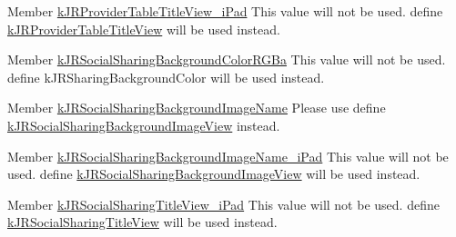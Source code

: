 \label{deprecated__deprecated000012}
\hypertarget{deprecated__deprecated000012}{}
 
\begin{DoxyDescription}
\item[Member \hyperlink{group__custom_interface_ga52c322e9fd2aa78cbd64d050f0fd5e41}{kJRProviderTableTitleView\_\-iPad} ]This value will not be used. define \hyperlink{group__custom_interface_ga0bce97edf43c9cdf53cbcd1aa92c4798}{kJRProviderTableTitleView} will be used instead. 
\end{DoxyDescription}

\label{deprecated__deprecated000005}
\hypertarget{deprecated__deprecated000005}{}
 
\begin{DoxyDescription}
\item[Member \hyperlink{group__custom_interface_ga6554a101f0e2e9474a77262143dc528b}{kJRSocialSharingBackgroundColorRGBa} ]This value will not be used. define kJRSharingBackgroundColor will be used instead. 
\end{DoxyDescription}

\label{deprecated__deprecated000008}
\hypertarget{deprecated__deprecated000008}{}
 
\begin{DoxyDescription}
\item[Member \hyperlink{group__custom_interface_gad2e00942af19ec9478ba58a491a8b8f2}{kJRSocialSharingBackgroundImageName} ]Please use define \hyperlink{group__custom_interface_gafe08832d1e15427e1bc1c8c1e3a4c641}{kJRSocialSharingBackgroundImageView} instead. 
\end{DoxyDescription}

\label{deprecated__deprecated000011}
\hypertarget{deprecated__deprecated000011}{}
 
\begin{DoxyDescription}
\item[Member \hyperlink{group__custom_interface_ga646cb35f3a7ec2835872ee6df2aceb76}{kJRSocialSharingBackgroundImageName\_\-iPad} ]This value will not be used. define \hyperlink{group__custom_interface_gafe08832d1e15427e1bc1c8c1e3a4c641}{kJRSocialSharingBackgroundImageView} will be used instead. 
\end{DoxyDescription}

\label{deprecated__deprecated000013}
\hypertarget{deprecated__deprecated000013}{}
 
\begin{DoxyDescription}
\item[Member \hyperlink{group__custom_interface_ga2f88062cdd1fd38ad0e800d382450398}{kJRSocialSharingTitleView\_\-iPad} ]This value will not be used. define \hyperlink{group__custom_interface_ga524965cf426f0eb9de4bcb804528c7f7}{kJRSocialSharingTitleView} will be used instead. 
\end{DoxyDescription}

